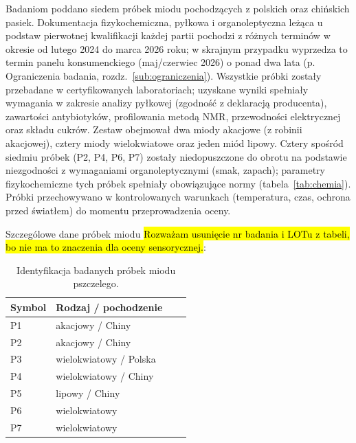 \documentclass[12pt,a4paper]{article}
\begin{document}
Badaniom poddano siedem próbek miodu pochodzących z polskich oraz chińskich pasiek.
Dokumentacja fizykochemiczna, pyłkowa i organoleptyczna leżąca u podstaw pierwotnej
kwalifikacji każdej partii pochodzi z różnych terminów w okresie od lutego 2024 do
marca 2026 roku; w skrajnym przypadku wyprzedza to termin panelu konsumenckiego
(maj/czerwiec 2026) o ponad dwa lata (p. Ograniczenia badania, rozdz.~\ref{sub:ograniczenia}).
Wszystkie próbki zostały przebadane w certyfikowanych laboratoriach; uzyskane wyniki spełniały
wymagania w zakresie analizy pyłkowej (zgodność z deklaracją producenta), zawartości antybiotyków,
profilowania metodą NMR, przewodności elektrycznej oraz składu cukrów.
Zestaw obejmował dwa miody akacjowe (z robinii akacjowej), cztery miody wielokwiatowe oraz jeden miód lipowy.
Cztery spośród siedmiu próbek (P2, P4, P6, P7) zostały niedopuszczone do obrotu na podstawie niezgodności
z wymaganiami organoleptycznymi (smak, zapach); parametry fizykochemiczne tych próbek spełniały
obowiązujące normy (tabela~\ref{tab:chemia}).
Próbki przechowywano w kontrolowanych warunkach (temperatura, czas, ochrona przed światłem)
do momentu przeprowadzenia oceny.

Szczególowe dane próbek miodu \hl{Rozważam usunięcie nr badania i LOTu z tabeli, bo nie ma to znaczenia dla oceny sensorycznej.}:

\begin{table}[h!]
\centering
\caption{Identyfikacja badanych próbek miodu pszczelego.}
\label{tab:probki}
\footnotesize
\begin{tabular}{@{}llll@{}}
\toprule
Symbol & Rodzaj / pochodzenie \\
\midrule
P1 & akacjowy / Chiny \\
P2 & akacjowy / Chiny \\
P3 & wielokwiatowy / Polska \\
P4 & wielokwiatowy / Chiny \\
P5 & lipowy / Chiny  \\
P6 & wielokwiatowy  \\
P7 & wielokwiatowy  \\
\bottomrule
\end{tabular}
\end{table}
\end{document}
